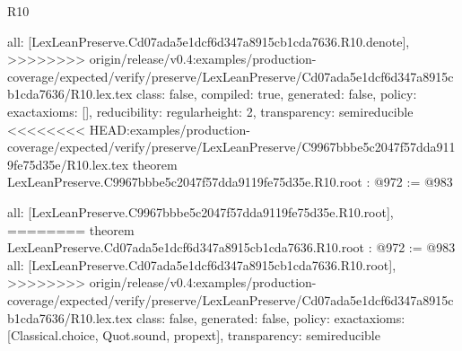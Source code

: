 \begin{lexlean}{R10}
\begin{coremodule}
{{{{{  all: [LexLeanPreserve.Cd07ada5e1dcf6d347a8915cb1cda7636.R10.denote],
>>>>>>>> origin/release/v0.4:examples/production-coverage/expected/verify/preserve/LexLeanPreserve/Cd07ada5e1dcf6d347a8915cb1cda7636/R10.lex.tex
  class: false,
  compiled: true,
  generated: false,
  policy: exact{axioms: []},
  reducibility: regular{height: 2},
  transparency: semireducible
}
<<<<<<<< HEAD:examples/production-coverage/expected/verify/preserve/LexLeanPreserve/C9967bbbe5c2047f57dda9119fe75d35e/R10.lex.tex
theorem LexLeanPreserve.C9967bbbe5c2047f57dda9119fe75d35e.R10.root : @972 := @983 {
  all: [LexLeanPreserve.C9967bbbe5c2047f57dda9119fe75d35e.R10.root],
========
theorem LexLeanPreserve.Cd07ada5e1dcf6d347a8915cb1cda7636.R10.root : @972 := @983 {
  all: [LexLeanPreserve.Cd07ada5e1dcf6d347a8915cb1cda7636.R10.root],
>>>>>>>> origin/release/v0.4:examples/production-coverage/expected/verify/preserve/LexLeanPreserve/Cd07ada5e1dcf6d347a8915cb1cda7636/R10.lex.tex
  class: false,
  generated: false,
  policy: exact{axioms: [Classical.choice, Quot.sound, propext]},
  transparency: semireducible
}

}}}}}
\end{coremodule}
\end{lexlean}

